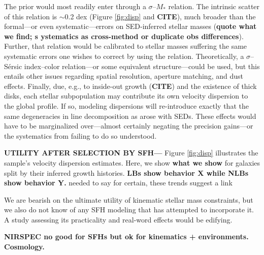 \documentclass[a4paper,fleqn,usenatbib]{mnras}
\newcommand{\Mstel}{M_\ast}
\newcommand{\bfr}{\bf\color{red}}
\newcommand{\CITE}{{\bfr CITE}}
\begin{document}
The prior would most readily enter through a $\sigma$--$\Mstel$ relation. The intrinsic scatter
of this relation is $\sim$0.2 dex (Figure \ref{fig:disp} and \CITE), much broader than the 
formal---or even systematic---errors on SED-inferred stellar masses ({\bfr quote what we find; s
ystematics as cross-method or duplicate obs differences}). Further, that relation would be calibrated to 
stellar masses suffering the same 
systematic errors one wishes to correct by using the relation. Theoretically, a $\sigma$--S\'{e}rsic 
index--color relation---or some equivalent structure---could be used, but this entails other issues 
regarding spatial resolution, aperture matching, and dust effects. Finally, due, e.g., to inside-out 
growth (\CITE) and the existence of thick disks, each stellar subpopulation may contribute its own velocity 
dispersion to the global profile. If so, modeling dispersions will re-introduce exactly that the same 
degeneracies in line decomposition as arose with SEDs. These 
effects would have to be marginalized over---almost certainly negating the precision gains---or the 
systematics from failing to do so understood.

{\bfr UTILITY AFTER SELECTION BY SFH---} Figure \ref{fig:disp} illustrates the sample's 
velocity dispersion estimates. Here, we show {\bfr what we show} for galaxies split by their inferred 
growth histories. {\bfr LBs show behavior X while NLBs show behavior Y.} %
needed to say for certain, these trends suggest a link


We are bearish on the ultimate utility of kinematic stellar mass constraints, 
but we also do not know of any SFH modeling that has attempted to incorporate it. A 
study assessing its practicality and real-word effects would be edifying.

{\bfr NIRSPEC no good for SFHs but ok for kinematics + environments. Cosmology.}
\end{document}
